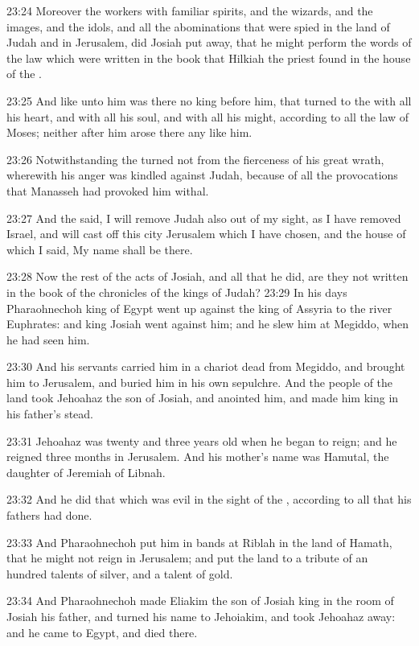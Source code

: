 23:24 Moreover the workers with familiar spirits, and the wizards, and
the images, and the idols, and all the abominations that were spied in
the land of Judah and in Jerusalem, did Josiah put away, that he might
perform the words of the law which were written in the book that
Hilkiah the priest found in the house of the \LORD.

23:25 And like unto him was there no king before him, that turned to
the \LORD with all his heart, and with all his soul, and with all his
might, according to all the law of Moses; neither after him arose
there any like him.

23:26 Notwithstanding the \LORD turned not from the fierceness of his
great wrath, wherewith his anger was kindled against Judah, because of
all the provocations that Manasseh had provoked him withal.

23:27 And the \LORD said, I will remove Judah also out of my sight, as
I have removed Israel, and will cast off this city Jerusalem which I
have chosen, and the house of which I said, My name shall be there.

23:28 Now the rest of the acts of Josiah, and all that he did, are
they not written in the book of the chronicles of the kings of Judah?
23:29 In his days Pharaohnechoh king of Egypt went up against the king
of Assyria to the river Euphrates: and king Josiah went against him;
and he slew him at Megiddo, when he had seen him.

23:30 And his servants carried him in a chariot dead from Megiddo, and
brought him to Jerusalem, and buried him in his own sepulchre. And the
people of the land took Jehoahaz the son of Josiah, and anointed him,
and made him king in his father's stead.

23:31 Jehoahaz was twenty and three years old when he began to reign;
and he reigned three months in Jerusalem. And his mother's name was
Hamutal, the daughter of Jeremiah of Libnah.

23:32 And he did that which was evil in the sight of the \LORD,
according to all that his fathers had done.

23:33 And Pharaohnechoh put him in bands at Riblah in the land of
Hamath, that he might not reign in Jerusalem; and put the land to a
tribute of an hundred talents of silver, and a talent of gold.

23:34 And Pharaohnechoh made Eliakim the son of Josiah king in the
room of Josiah his father, and turned his name to Jehoiakim, and took
Jehoahaz away: and he came to Egypt, and died there.

